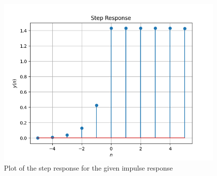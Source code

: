 \documentclass[journal,12pt,twocolumn]{IEEEtran}
\begin{document}
	\begin{figure}[!ht]
		\centering
		\includegraphics[width=\columnwidth]{./figs/fig-1.png}
		\caption{Plot of the step response for the given impulse response}
		\label{fig-1}	
	\end{figure}
\end{document}

